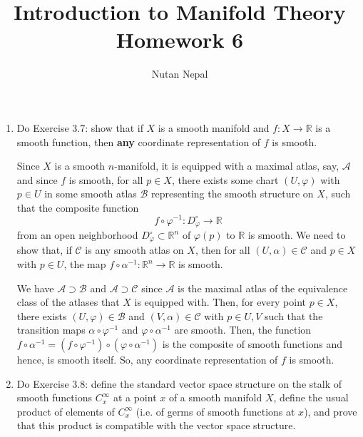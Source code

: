 \documentclass[12pt]{article}
\title{Introduction to Manifold Theory \\
\large Homework 6
}
\author{Nutan Nepal}
\newcommand{\rl}{\mathbb{R}}
\begin{document}
\maketitle
\makebox[\linewidth]{\rule{200mm}{1pt}}
\vspace{1mm}

\begin{enumerate}

\item Do Exercise 3.7: show that if $X$ is a smooth
    manifold and $f \colon X \to \rl$ is a smooth
    function, then \textbf{any} coordinate representation
    of $f$ is smooth.

\begin{mybox}

    Since $X$ is a smooth $n$-manifold, it is equipped with
    a maximal atlas, say, $\mathcal{A}$ and since $f$ is
    smooth, for all $p\in X$, there exists some chart
    $(U,\varphi)$ with $p\in U$ in some smooth
    atlas $\mathcal{B}$
    representing the smooth structure on $X$,
    such that the composite function
    $$f\circ\varphi^{-1}:D_\varphi^\circ \to \rl $$
    from an open neighborhood $D_\varphi^\circ\subset\rl^n$
    of $\varphi(p)$ to $\rl$ is smooth. We need to show
    that, if $\mathcal{C}$ is any smooth atlas on $X$, then
    for all $(U,\alpha)\in\mathcal{C}$ and $p\in X$ with
    $p\in U$, the map $f\circ \alpha^{-1}:\rl^n\to\rl$ is
    smooth.

    \vspace*{3mm}
    We have $\mathcal{A}\supset \mathcal{B}$ and
    $\mathcal{A}\supset\mathcal{C}$ since $\mathcal{A}$ is
    the maximal atlas of the equivalence class of the
    atlases that $X$ is equipped with.
    Then, for every point $p\in X$,
    there exists $(U,\varphi)\in\mathcal{B}$ and
    $(V,\alpha)\in \mathcal{C}$ with $p\in U, V$
    such that the transition maps $\alpha\circ\varphi^{-1}$
    and $\varphi\circ\alpha^{-1}$ are smooth. Then, the
    function
    $f\circ\alpha^{-1}=(f\circ\varphi^{-1})\circ
    (\varphi\circ\alpha^{-1})$ is the composite of smooth
    functions and hence, is smooth itself. So, any
    coordinate representation of $f$ is smooth.
\end{mybox}

\item Do Exercise 3.8: define the standard vector space
    structure on the stalk of smooth functions
    $C^{\infty}_x$ at a point $x$ of a smooth manifold
    $X$, define the usual product of elements of
    $C^{\infty}_x$ (i.e. of germs of smooth functions
    at $x$), and prove that this product is compatible
    with the vector space structure.
 

\end{enumerate}
\end{document}
